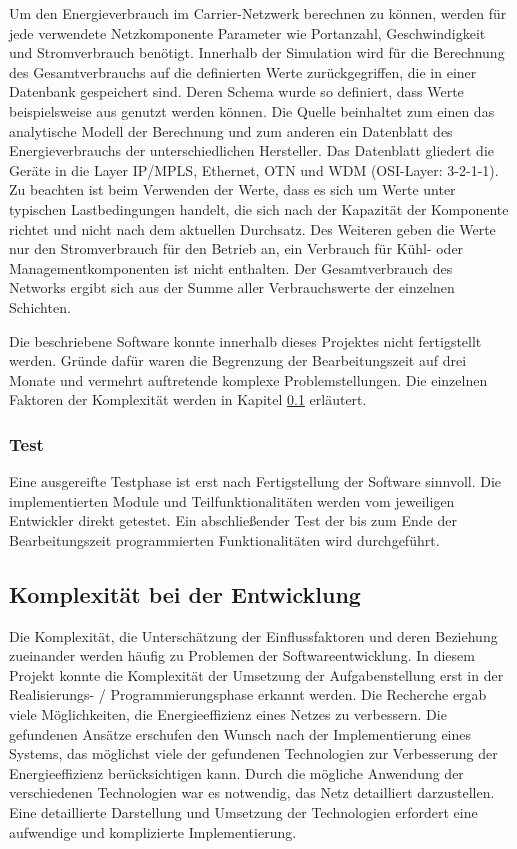 Um den Energieverbrauch im Carrier-Netzwerk berechnen zu können, werden für jede verwendete Netzkomponente Parameter wie Portanzahl, Geschwindigkeit und Stromverbrauch benötigt. Innerhalb der Simulation wird für die Berechnung des Gesamtverbrauchs auf die definierten Werte zurückgegriffen, die in einer Datenbank gespeichert sind. Deren Schema wurde so definiert, dass Werte beispielsweise aus \cite{vanhedde} genutzt werden können. Die Quelle beinhaltet zum einen das analytische Modell der Berechnung und zum anderen ein Datenblatt \cite{vanhsheet} des Energieverbrauchs der unterschiedlichen Hersteller. Das Datenblatt gliedert die Geräte in die Layer IP/MPLS, Ethernet, OTN und WDM (OSI-Layer: 3-2-1-1). Zu beachten ist beim Verwenden der Werte, dass es sich um Werte unter typischen Lastbedingungen handelt, die sich nach der Kapazität der Komponente richtet und nicht nach dem aktuellen Durchsatz. Des Weiteren geben die Werte nur den Stromverbrauch für den Betrieb an, ein Verbrauch für Kühl- oder Managementkomponenten ist nicht enthalten.
Der Gesamtverbrauch des Networks ergibt sich aus der Summe aller Verbrauchswerte der einzelnen Schichten.

Die beschriebene Software konnte innerhalb dieses Projektes nicht fertigstellt werden. Gründe dafür waren die Begrenzung der Bearbeitungszeit auf drei Monate und vermehrt auftretende komplexe Problemstellungen. Die einzelnen Faktoren der Komplexität werden in Kapitel \ref{subsec:VorgKomplx} erläutert.

\subsubsection{Test}
Eine ausgereifte Testphase ist erst nach Fertigstellung der Software sinnvoll. Die implementierten Module und Teilfunktionalitäten werden vom jeweiligen Entwickler direkt getestet. Ein abschließender Test der bis zum Ende der Bearbeitungszeit programmierten Funktionalitäten wird durchgeführt.


\subsection{Komplexität bei der Entwicklung} \label{subsec:VorgKomplx}
Die Komplexität, die Unterschätzung der Einflussfaktoren und deren Beziehung zueinander werden häufig zu Problemen der Softwareentwicklung. In diesem Projekt konnte die Komplexität der Umsetzung der Aufgabenstellung erst in der Realisierungs- / Programmierungsphase erkannt werden. Die Recherche ergab viele Möglichkeiten, die Energieeffizienz eines Netzes zu verbessern. Die gefundenen Ansätze erschufen den Wunsch nach der Implementierung eines Systems, das möglichst viele der gefundenen Technologien zur Verbesserung der Energieeffizienz berücksichtigen kann. Durch die mögliche Anwendung der verschiedenen Technologien war es notwendig, das Netz detailliert darzustellen. Eine detaillierte Darstellung und Umsetzung der Technologien erfordert eine aufwendige und komplizierte Implementierung. 

